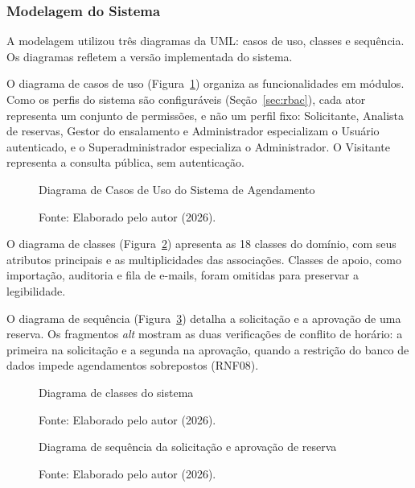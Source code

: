 \documentclass[
	12pt,				%
	twoside,			%
	openany,			%
	a4paper,			%
	chapter=TITLE,		%
	section=TITLE,		%
	subsection=TITLE,	%
	subsubsection=TITLE,%
	english,			%
	french,				%
	spanish,			%
	brazil,				%
	]{abntex2}
\begin{document}
\subsubsection{Modelagem do Sistema}
\label{sec:modelagem}

A modelagem utilizou três diagramas da UML: casos de uso, classes e sequência. Os diagramas refletem a versão implementada do sistema.

O diagrama de casos de uso (Figura~\ref{fig:casos_uso}) organiza as funcionalidades em módulos. Como os perfis do sistema são configuráveis (Seção~\ref{sec:rbac}), cada ator representa um conjunto de permissões, e não um perfil fixo: Solicitante, Analista de reservas, Gestor do ensalamento e Administrador especializam o Usuário autenticado, e o Superadministrador especializa o Administrador. O Visitante representa a consulta pública, sem autenticação.

\begin{figure}[!htb]
    \centering
    \caption{Diagrama de Casos de Uso do Sistema de Agendamento}
    \resizebox{\textwidth}{!}{}
    \caption*{Fonte: Elaborado pelo autor (2026).}
    \label{fig:casos_uso}
\end{figure}

O diagrama de classes (Figura~\ref{fig:classes}) apresenta as 18 classes do domínio, com seus atributos principais e as multiplicidades das associações. Classes de apoio, como importação, auditoria e fila de e-mails, foram omitidas para preservar a legibilidade.

O diagrama de sequência (Figura~\ref{fig:sequencia}) detalha a solicitação e a aprovação de uma reserva. Os fragmentos \textit{alt} mostram as duas verificações de conflito de horário: a primeira na solicitação e a segunda na aprovação, quando a restrição do banco de dados impede agendamentos sobrepostos (RNF08).

\begin{figure}[p]
    \centering
    \caption{Diagrama de classes do sistema}
    \resizebox{\textwidth}{!}{}
    \caption*{Fonte: Elaborado pelo autor (2026).}
    \label{fig:classes}
\end{figure}

\begin{figure}[p]
    \centering
    \caption{Diagrama de sequência da solicitação e aprovação de reserva}
    \resizebox{\textwidth}{!}{}
    \caption*{Fonte: Elaborado pelo autor (2026).}
    \label{fig:sequencia}
\end{figure}
\end{document}
